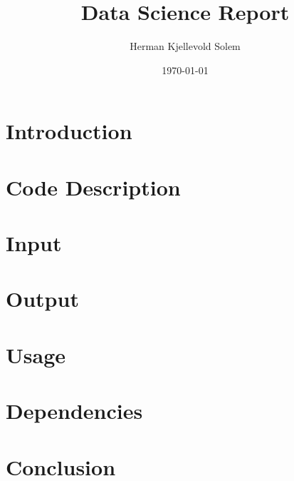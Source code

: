 \documentclass{article}
\begin{document}
\title{Data Science Report}
\author{Herman Kjellevold Solem}
\date{\today}

\maketitle

\section{Introduction}

\section{Code Description}

\section{Input}

\section{Output}

\section{Usage}

\section{Dependencies}

\section{Conclusion}
\end{document}
